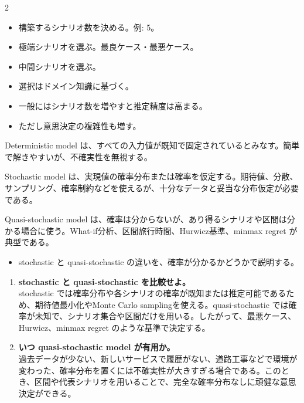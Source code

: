 \clearpage
{}
\begin{multicols}{2}\footnotesize\raggedcolumns
{}
\begin{itemize}
\item 構築するシナリオ数を決める。例: 5。
\item 極端シナリオを選ぶ。最良ケース・最悪ケース。
\item 中間シナリオを選ぶ。
\item 選択はドメイン知識に基づく。
\item 一般にはシナリオ数を増やすと推定精度は高まる。
\item ただし意思決定の複雑性も増す。
\end{itemize}
Deterministic model は、すべての入力値が既知で固定されているとみなす。簡単で解きやすいが、不確実性を無視する。\par

Stochastic model は、実現値の確率分布または確率を仮定する。期待値、分散、サンプリング、確率制約などを使えるが、十分なデータと妥当な分布仮定が必要である。\par

Quasi-stochastic model は、確率は分からないが、あり得るシナリオや区間は分かる場合に使う。What-if分析、区間旅行時間、Hurwicz基準、minmax regret が典型である。\par
{}
\begin{itemize}
\item stochastic と quasi-stochastic の違いを、確率が分かるかどうかで説明する。
\end{itemize}
\begin{enumerate}
\item \textbf{stochastic と quasi-stochastic を比較せよ。}\\stochastic では確率分布や各シナリオの確率が既知または推定可能であるため、期待値最小化やMonte Carlo samplingを使える。quasi-stochastic では確率が未知で、シナリオ集合や区間だけを用いる。したがって、最悪ケース、Hurwicz、minmax regret のような基準で決定する。
\item \textbf{いつ quasi-stochastic model が有用か。}\\過去データが少ない、新しいサービスで履歴がない、道路工事などで環境が変わった、確率分布を置くには不確実性が大きすぎる場合である。このとき、区間や代表シナリオを用いることで、完全な確率分布なしに頑健な意思決定ができる。
\end{enumerate}
\end{multicols}

